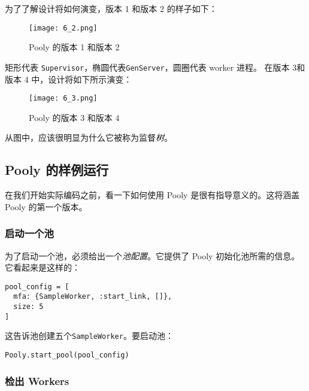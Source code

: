 为了了解设计将如何演变，版本 1 和版本 2 的样子如下：

\begin{figure}[!ht]
    \centering
    \texttt{[image: 6\_2.png]}
    \caption{Pooly 的版本 1 和版本 2}
    \label{fig:6_2}
\end{figure}

矩形代表 \texttt{Supervisor}，椭圆代表\texttt{GenServer}，圆圈代表 worker 进程。
在版本 3和版本 4 中，设计将如下所示演变：

\begin{figure}[!ht]
    \centering
    \texttt{[image: 6\_3.png]}
    \caption{Pooly 的版本 3 和版本 4}
    \label{fig:6_3}
\end{figure}

从图中，应该很明显为什么它被称为监督\emph{树}。

\subsection{Pooly 的样例运行}

在我们开始实际编码之前，看一下如何使用 Pooly 是很有指导意义的。这将涵盖
Pooly 的第一个版本。


\subsubsection{启动一个池}

为了启动一个池，必须给出一个\emph{池配置}。它提供了 Pooly
初始化池所需的信息。它看起来是这样的：

\begin{code}{}
\begin{verbatim}
pool_config = [
  mfa: {SampleWorker, :start_link, []},
  size: 5
]
\end{verbatim}
\end{code}

这告诉池创建五个\texttt{SampleWorker}。要启动池：

\begin{code}{}
\begin{verbatim}
Pooly.start_pool(pool_config)
\end{verbatim}
\end{code}


\subsubsection{检出 Workers}

